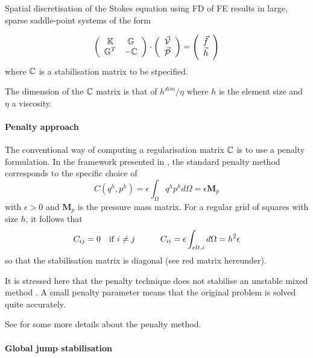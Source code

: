 Spatial discretisation of the Stokes equation using FD of FE results 
in large, sparse saddle-point systems of the form

\begin{equation}
\left(
\begin{array}{cc}
{\mathbb{K}} & {\mathbb{G}} \\
{\mathbb{G}}^T & -{\mathbb{C}}
\end{array}
\right)
\cdot
\left(
\begin{array}{c}
\vec{\cal V} \\ \vec{\cal P}
\end{array}
\right)
=
\left(
\begin{array}{c}
\vec{f} \\  \vec{h}
\end{array}
\right)
\end{equation}
where ${\mathbb{C}}$ is a stabilisation matrix to be stpecified.

The dimension of the ${\mathbb{C}}$ matrix is that of $h^{dim}/\eta$ where 
$h$ is the element size and $\eta$ a viscosity.







\paragraph{Penalty approach}

The conventional way of computing a regularisation matrix ${\mathbb{C}}$
is to use a penalty formulation.
In the framework presented in \cite{sike90}, the standard penalty
method corresponds to the specific choice of
\[
C(q^h,p^h)=\epsilon \int_\Omega q^h p^h d\Omega = \epsilon {\bm M}_p
\]
with $\epsilon > 0$ and ${\bm M}_p$ is the pressure mass matrix. 
For a regular grid of squares with size $h$, it follows that 
\[
C_{ij}=0 \quad {\rm if} \; i\neq j
\quad\quad\quad
C_{ii}=\epsilon \int_{elt. i} d\Omega = h^2 \epsilon
\]
so that the stabilisation matrix is diagonal (see red matrix hereunder).

It is stressed here that the penalty technique does not stabilise an  
unstable mixed method \cite{sike90}. A small penalty parameter 
means that the original problem is solved quite accurately.

See \cite{cuss86} for some more details about the penalty method.

\paragraph{Global jump stabilisation}

